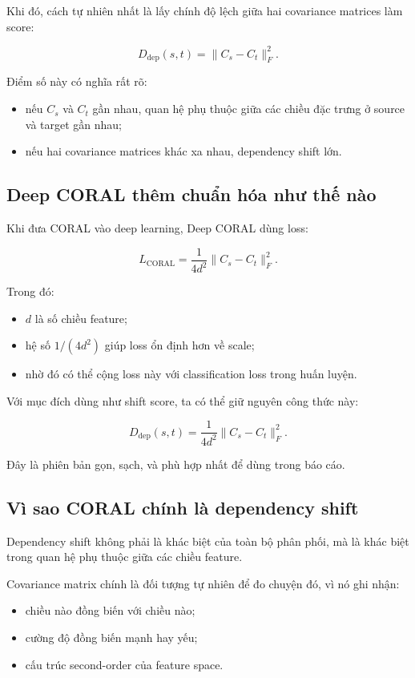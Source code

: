 \documentclass[a4paper]{article}
\begin{document}
Khi đó, cách tự nhiên nhất là lấy chính độ lệch giữa hai covariance matrices làm score:

\[
D_{\mathrm{dep}}(s,t) = \|C_s - C_t\|_F^2.
\]

Điểm số này có nghĩa rất rõ:

\begin{itemize}
    \item nếu $C_s$ và $C_t$ gần nhau, quan hệ phụ thuộc giữa các chiều đặc trưng ở source và target gần nhau;
    \item nếu hai covariance matrices khác xa nhau, dependency shift lớn.
\end{itemize}

\subsection{Deep CORAL thêm chuẩn hóa như thế nào}

Khi đưa CORAL vào deep learning, Deep CORAL dùng loss:

\[
L_{\mathrm{CORAL}} = \frac{1}{4d^2} \|C_s - C_t\|_F^2.
\]

Trong đó:

\begin{itemize}
    \item $d$ là số chiều feature;
    \item hệ số $1/(4d^2)$ giúp loss ổn định hơn về scale;
    \item nhờ đó có thể cộng loss này với classification loss trong huấn luyện.
\end{itemize}

Với mục đích dùng như shift score, ta có thể giữ nguyên công thức này:

\[
D_{\mathrm{dep}}(s,t) = \frac{1}{4d^2} \|C_s - C_t\|_F^2.
\]

Đây là phiên bản gọn, sạch, và phù hợp nhất để dùng trong báo cáo.

\subsection{Vì sao CORAL chính là dependency shift}

Dependency shift không phải là khác biệt của toàn bộ phân phối, mà là khác biệt trong quan hệ phụ thuộc giữa các chiều feature.

Covariance matrix chính là đối tượng tự nhiên để đo chuyện đó, vì nó ghi nhận:

\begin{itemize}
    \item chiều nào đồng biến với chiều nào;
    \item cường độ đồng biến mạnh hay yếu;
    \item cấu trúc second-order của feature space.
\end{itemize}
\end{document}
